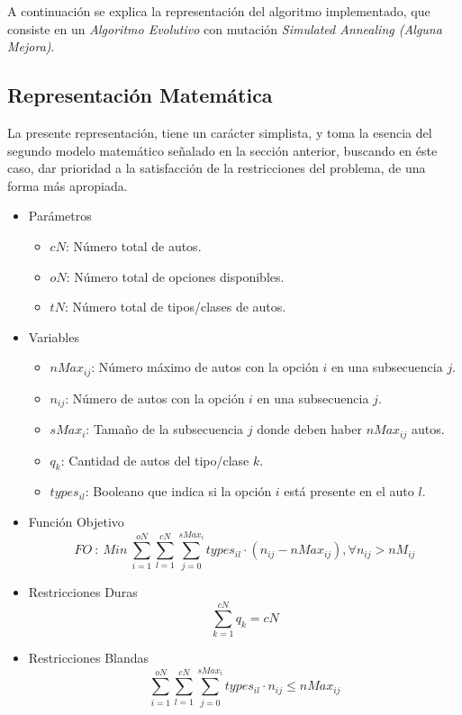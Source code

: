 A continuación se explica la representación del algoritmo implementado,
que consiste en un \emph{Algoritmo Evolutivo} con mutación \emph{Simulated
Annealing (Alguna Mejora)}.

\subsection{Representación Matemática}

La presente representación, tiene un carácter simplista, y toma la esencia del segundo modelo
matemático señalado en la sección anterior, buscando en éste caso, dar prioridad a la satisfacción
de la restricciones del problema, de una forma más apropiada.

\begin{itemize}
	\item Parámetros
	\begin{itemize}
		\item $cN$: Número total de autos.
		\item $oN$: Número total de opciones disponibles.
		\item $tN$: Número total de tipos/clases de autos.
	\end{itemize}
	\item Variables
	\begin{itemize}
		\item $nMax_{ij}$: Número máximo de autos con la opción $i$ en una subsecuencia $j$.
		\item $n_{ij}$: Número de autos con la opción $i$ en una subsecuencia $j$.
		\item $sMax_{i}$: Tamaño de la subsecuencia $j$ donde deben haber $nMax_{ij}$ autos.
		\item $q_{k}$: Cantidad de autos del tipo/clase $k$.
		\item $types_{il}$: Booleano que indica si la opción $i$ está presente en el auto $l$.
	\end{itemize}
	\item Función Objetivo
	$$FO\ :\ Min\ \sum\limits_{i=1}^{oN} \sum\limits_{l=1}^{cN} \sum\limits_{j=0}^{sMax_{i}} types_{il}\cdot (n_{ij} - nMax_{ij}), \forall n_{ij} > nM_{ij}$$
	\item Restricciones Duras
	$$\sum\limits_{k=1}^{cN} q_{k} = cN$$
	\item Restricciones Blandas
	$$\sum\limits_{i=1}^{oN} \sum\limits_{l=1}^{cN} \sum\limits_{j=0}^{sMax_{i}} types_{il}\cdot n_{ij} \leq nMax_{ij}$$
\end{itemize}
